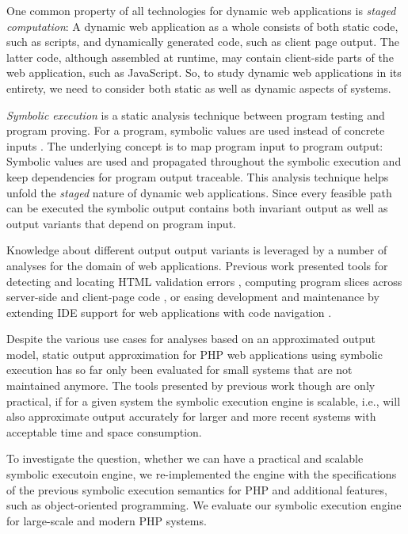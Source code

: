 \documentclass[sigconf]{acmart}
\begin{document}
One common property of all technologies for dynamic web applications is
\emph{staged computation}: A dynamic web application as a whole
consists of both static code, such as scripts, and dynamically generated code,
such as client page output. The latter code, although assembled at
runtime, may contain client-side parts of the web application, such as
JavaScript. So, to study dynamic web applications in its entirety, we need to
consider both static as well as dynamic aspects of systems.

\emph{Symbolic execution} is a static analysis technique between program testing
and program proving. For a program, symbolic values are
used instead of concrete inputs \cite{Darringer1978,King1976}. The underlying
concept is to map program input to program output: Symbolic values are used and
propagated throughout the symbolic execution and keep dependencies for program
output traceable. This analysis technique helps unfold the \emph{staged} nature
of dynamic web applications. Since every feasible path can be executed the
symbolic output contains both invariant output as well as output variants that
depend on program input.

Knowledge about different output output variants is leveraged by a number of
analyses for the domain of web applications. Previous work presented tools
for detecting and locating HTML validation errors
\cite{Nguyen:2011:AFH:2190078.2190142}, computing program slices across
server-side and client-page code \cite{Nguyen:2015:CPS:2786805.2786872}, or
easing development and maintenance by extending IDE support for web applications
with code navigation
\cite{Nguyen:2015:VIS:2819009.2819140,Nguyen:2014:BCG:2635868.2635928}.

Despite the various use cases for analyses based on an approximated output
model, static output approximation for PHP web applications using symbolic
execution has so far only been evaluated for small systems that are not
maintained anymore. The tools presented by previous work
\cite{Nguyen:2015:VIS:2819009.2819140,Nguyen:2014:BCG:2635868.2635928,Nguyen:2015:CPS:2786805.2786872,Nguyen:2011:AFH:2190078.2190142}
though are only practical, if for a given system the symbolic execution engine
is scalable, i.e., will also approximate output accurately for larger and more
recent systems with acceptable time and space consumption.

To investigate the question, whether we can have a practical and scalable
symbolic executoin engine, we re-implemented the engine with the specifications
of the previous symbolic execution semantics \cite{Nguyen:2014:BCG:2635868.2635928} for PHP and additional features, such
as object-oriented programming. We evaluate our
symbolic execution engine for large-scale and modern PHP systems.
\end{document}
